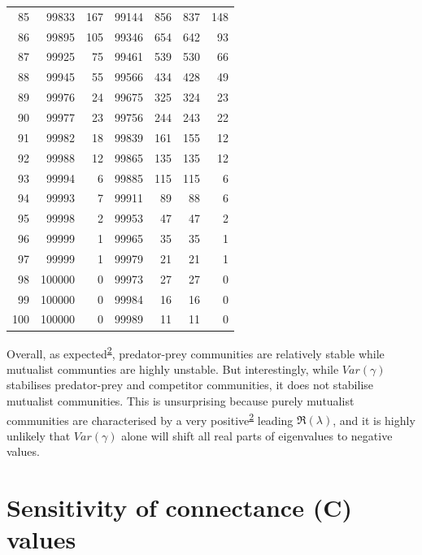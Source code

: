 \documentclass[]{article}
\begin{document}
\begin{longtable}[]{@{}rrrrrrr@{}}
85 & 99833 & 167 & 99144 & 856 & 837 & 148\tabularnewline
86 & 99895 & 105 & 99346 & 654 & 642 & 93\tabularnewline
87 & 99925 & 75 & 99461 & 539 & 530 & 66\tabularnewline
88 & 99945 & 55 & 99566 & 434 & 428 & 49\tabularnewline
89 & 99976 & 24 & 99675 & 325 & 324 & 23\tabularnewline
90 & 99977 & 23 & 99756 & 244 & 243 & 22\tabularnewline
91 & 99982 & 18 & 99839 & 161 & 155 & 12\tabularnewline
92 & 99988 & 12 & 99865 & 135 & 135 & 12\tabularnewline
93 & 99994 & 6 & 99885 & 115 & 115 & 6\tabularnewline
94 & 99993 & 7 & 99911 & 89 & 88 & 6\tabularnewline
95 & 99998 & 2 & 99953 & 47 & 47 & 2\tabularnewline
96 & 99999 & 1 & 99965 & 35 & 35 & 1\tabularnewline
97 & 99999 & 1 & 99979 & 21 & 21 & 1\tabularnewline
98 & 100000 & 0 & 99973 & 27 & 27 & 0\tabularnewline
99 & 100000 & 0 & 99984 & 16 & 16 & 0\tabularnewline
100 & 100000 & 0 & 99989 & 11 & 11 & 0\tabularnewline
\bottomrule
\end{longtable}

Overall, as
expected\textsuperscript{\protect\hyperlink{ref-Allesina2012}{2}},
predator-prey communities are relatively stable while mutualist
communties are highly unstable. But interestingly, while \(Var(\gamma)\)
stabilises predator-prey and competitor communities, it does not
stabilise mutualist communities. This is unsurprising because purely
mutualist communities are characterised by a very
positive\textsuperscript{\protect\hyperlink{ref-Allesina2012}{2}}
leading \(\Re(\lambda)\), and it is highly unlikely that \(Var(\gamma)\)
alone will shift all real parts of eigenvalues to negative values.

\hypertarget{connectance}{%
\section{Sensitivity of connectance (C) values}\label{connectance}}
\end{document}
